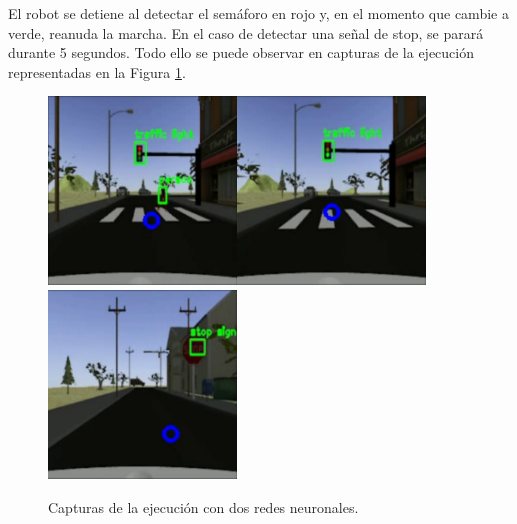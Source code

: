 El robot se detiene al detectar el semáforo en rojo y, en el momento que cambie a verde, reanuda la marcha. En el caso de detectar una señal de stop, se parará durante 5 segundos.
Todo ello se puede observar en capturas de la ejecución representadas en la Figura \ref{fig:simexecution}.\\

\begin{figure} [h!]
	\begin{center}
		\includegraphics[width=5cm]{figs/simRed}\hspace{0.1cm}\includegraphics[width=5cm]{figs/simGreen}\hspace{0.1cm}\includegraphics[width=5cm]{figs/simStop}
	\end{center}
	\caption{Capturas de la ejecución con dos redes neuronales.}
	\label{fig:simexecution}
\end{figure}\

